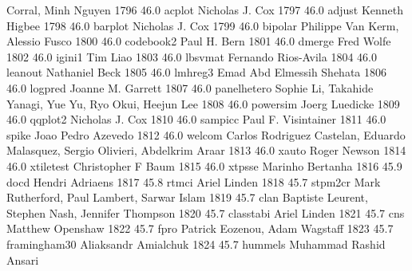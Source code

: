                                    Corral, Minh Nguyen                     
  1796     46.0    acplot        Nicholas J. Cox                         
  1797     46.0    adjust        Kenneth Higbee                          
  1798     46.0    barplot       Nicholas J. Cox                         
  1799     46.0    bipolar       Philippe Van Kerm, Alessio Fusco        
  1800     46.0    codebook2     Paul H. Bern                            
  1801     46.0    dmerge        Fred Wolfe                              
  1802     46.0    igini1        Tim Liao                                
  1803     46.0    lbsvmat       Fernando Rios-Avila                     
  1804     46.0    leanout       Nathaniel Beck                          
  1805     46.0    lmhreg3       Emad Abd Elmessih Shehata               
  1806     46.0    logpred       Joanne M. Garrett                       
  1807     46.0    panelhetero   Sophie Li, Takahide Yanagi, Yue Yu, Ryo 
                                   Okui, Heejun Lee                        
  1808     46.0    powersim      Joerg Luedicke                          
  1809     46.0    qqplot2       Nicholas J. Cox                         
  1810     46.0    sampicc       Paul F. Visintainer                     
  1811     46.0    spike         Joao Pedro Azevedo                      
  1812     46.0    welcom        Carlos Rodriguez Castelan, Eduardo      
                                   Malasquez, Sergio Olivieri, Abdelkrim   
                                   Araar                                   
  1813     46.0    xauto         Roger Newson                            
  1814     46.0    xtiletest     Christopher F Baum                      
  1815     46.0    xtpsse        Marinho Bertanha                        
  1816     45.9    docd          Hendri Adriaens                         
  1817     45.8    rtmci         Ariel Linden                            
  1818     45.7    stpm2cr       Mark Rutherford, Paul Lambert, Sarwar   
                                   Islam                                   
  1819     45.7    clan          Baptiste Leurent, Stephen Nash,         
                                   Jennifer Thompson                       
  1820     45.7    classtabi     Ariel Linden                            
  1821     45.7    cns           Matthew Openshaw                        
  1822     45.7    fpro          Patrick Eozenou, Adam Wagstaff          
  1823     45.7    framingham30  Aliaksandr Amialchuk                    
  1824     45.7    hummels       Muhammad Rashid Ansari                  
